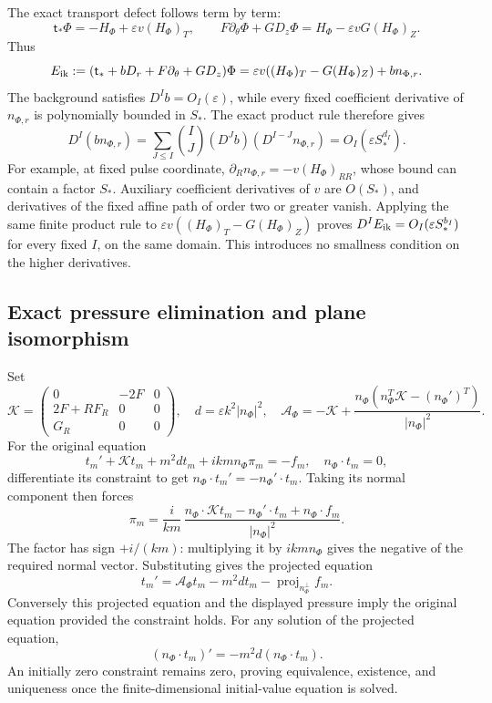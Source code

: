 \documentclass[10pt,a4paper]{article}
\begin{document}
The exact transport defect follows term by term: \[
\mathsf t_*\Phi=-H_\Phi+\varepsilon v(H_\Phi)_T,\qquad
F\partial_\theta\Phi+GD_z\Phi=H_\Phi-\varepsilon vG(H_\Phi)_Z.
\] Thus \[
E_{\rm ik}:=(\mathsf t_*+bD_r+F\partial_\theta+GD_z)\Phi
=\varepsilon v((H_\Phi)_T-G(H_\Phi)_Z)+bn_{\Phi,r}.
\] The background satisfies \(D^Ib=O_I(\varepsilon)\), while every
fixed coefficient derivative of \(n_{\Phi,r}\) is polynomially
bounded in \(S_*\). The exact product rule therefore gives
\[
D^I(bn_{\Phi,r})
=\sum_{J\le I}\binom IJ(D^Jb)(D^{I-J}n_{\Phi,r})
=O_I(\varepsilon S_*^{d_I}).
\]
For example, at fixed pulse coordinate,
\(\partial_Rn_{\Phi,r}=-v(H_\Phi)_{RR}\), whose bound can contain
a factor \(S_*\). Auxiliary coefficient derivatives of \(v\)
are \(O(S_*)\), and derivatives of the fixed affine path of order
two or greater vanish. Applying the same finite product rule
to \(\varepsilon v((H_\Phi)_T-G(H_\Phi)_Z)\) proves
\(D^IE_{\rm ik}=O_I(\varepsilon S_*^{b_I})\) for every fixed
\(I\), on the same domain. This introduces no smallness condition
on the higher derivatives.

\subsection{Exact pressure elimination and plane isomorphism}\label{exact-pressure-elimination-and-plane-isomorphism}

Set \[
\mathcal K=
\begin{pmatrix}0&-2F&0\\2F+RF_R&0&0\\G_R&0&0\end{pmatrix},
\quad d=\varepsilon k^2|n_\Phi|^2,\quad
\mathcal A_\Phi=-\mathcal K+
\frac{n_\Phi(n_\Phi^T\mathcal K-(n_\Phi')^T)}{|n_\Phi|^2}.
\] For the original equation \[
t_m'+\mathcal Kt_m+m^2dt_m+ikm n_\Phi\pi_m=-f_m,
\quad n_\Phi\cdot t_m=0,
\] differentiate its constraint to get \(n_\Phi\cdot t_m'=-n_\Phi'\cdot t_m\). Taking its normal component then forces \[
\pi_m=\frac{i}{km}\,
\frac{n_\Phi\cdot\mathcal Kt_m-n_\Phi'\cdot t_m+n_\Phi\cdot f_m}{|n_\Phi|^2}.
\] The factor has sign \(+i/(km)\): multiplying it by \(ikm n_\Phi\) gives the negative of the required normal vector. Substituting gives the projected equation \[
t_m'=\mathcal A_\Phi t_m-m^2dt_m-\operatorname{proj}_{n_\Phi^\perp}f_m.
\] Conversely this projected equation and the displayed pressure imply the original equation provided the constraint holds. For any solution of the projected equation, \[
(n_\Phi\cdot t_m)'=-m^2d(n_\Phi\cdot t_m).
\] An initially zero constraint remains zero, proving equivalence, existence, and uniqueness once the finite-dimensional initial-value equation is solved.
\end{document}
